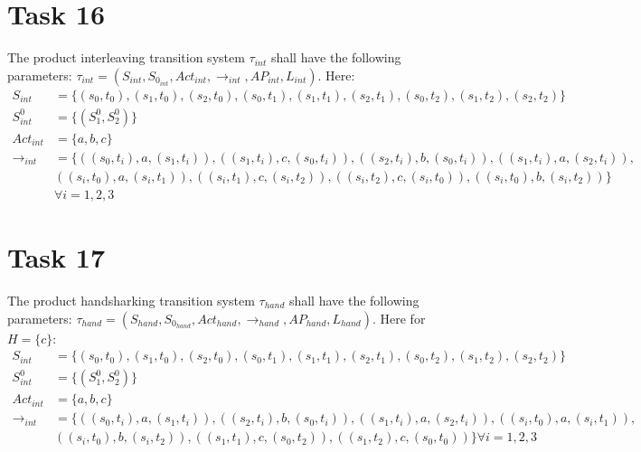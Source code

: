\documentclass[a4paper,12pt,oneside,onecolumn]{article} %
\begin{document}
\section*{Task 16}
The product interleaving transition system $\tau_{int}$ shall have the following parameters: 
$\tau_{int} = (S_{int}, S_{0_{int}}, Act_{int}, \rightarrow_{int}, AP_{int}, L_{int} )$. Here:
\begin{equation}
\begin{aligned}
    S_{int} & = \{(s_0, t_0), (s_1, t_0), (s_2, t_0), (s_0, t_1), (s_1, t_1), (s_2, t_1), (s_0, t_2), (s_1, t_2), (s_2, t_2)\} \\
    S_{int}^0 & = \{(S_1^0, S_2^0)\} \\
    Act_{int} & = \{a, b, c\} \\
    \rightarrow_{int} & = \{((s_0, t_i), a, (s_1, t_i)), ((s_1, t_i), c, (s_0, t_i)), ((s_2, t_i), b, (s_0, t_i)), ((s_1, t_i), a, (s_2, t_i)), \\ 
    & ((s_i, t_0), a, (s_i, t_1)), ((s_i, t_1), c, (s_i, t_2)), ((s_i, t_2), c, (s_i, t_0)), ((s_i, t_0), b, (s_i, t_2))\} \\ & \forall i = 1,2,3
\end{aligned}
\end{equation}

\section*{Task 17}
The product handsharking transition system $\tau_{hand}$ shall have the following parameters: 
$\tau_{hand} = (S_{hand}, S_{0_{hand}}, Act_{hand}, \rightarrow_{hand}, AP_{hand}, L_{hand} )$. Here for $H = \{c\}$:
\begin{equation}
\begin{aligned}
    S_{int} & = \{(s_0, t_0), (s_1, t_0), (s_2, t_0), (s_0, t_1), (s_1, t_1), (s_2, t_1), (s_0, t_2), (s_1, t_2), (s_2, t_2)\} \\
    S_{int}^0 & = \{(S_1^0, S_2^0)\} \\
    Act_{int} & = \{a, b, c\} \\
    \rightarrow_{int} & = \{((s_0, t_i), a, (s_1, t_i)), ((s_2, t_i), b, (s_0, t_i)), ((s_1, t_i), a, (s_2, t_i)), ((s_i, t_0), a, (s_i, t_1)), \\
    & ((s_i, t_0), b, (s_i, t_2)), ((s_1, t_1), c, (s_0, t_2)), ((s_1, t_2), c, (s_0, t_0))\} \forall i = 1,2,3
\end{aligned}
\end{equation}
\end{document}
